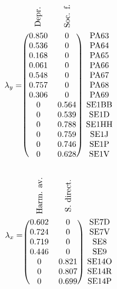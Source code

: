 \documentclass[11pt]{article}
\begin{document}
\begin{minipage}{0.32\linewidth}
\[
\lambda_y = 
\begin{blockarray}{ccc}
\rotatebox[]{90}{\textrm{\:\:Depr.}} & \rotatebox[]{90}{\textrm{\:\:Soc. f.}} \\
\begin{block}{(cc)c}
      0.850 & 0     & \textrm{PA63} \\
      0.536	& 0     & \textrm{PA64} \\
      0.168	& 0     & \textrm{PA65} \\
      0.061	& 0     & \textrm{PA66} \\
      0.548	& 0     & \textrm{PA67} \\
      0.757	& 0     & \textrm{PA68} \\
      0.306	& 0     & \textrm{PA69} \\
      0	    & 0.564 & \textrm{SE1BB} \\
      0	    & 0.539 & \textrm{SE1D} \\
      0	    & 0.788 & \textrm{SE1HH} \\
      0	    & 0.759 & \textrm{SE1J} \\
      0	    & 0.746 & \textrm{SE1P} \\
      0	    & 0.628 & \textrm{SE1V} \\ 
\end{block}
\end{blockarray}
\]
\end{minipage}
\begin{minipage}{0.45\linewidth}
\[
\lambda_x = 
\begin{blockarray}{ccc}
\rotatebox[]{90}{\textrm{\:\:Harm. av.}} & \rotatebox[]{90}{\textrm{\:\:S. direct.}} & \\
\begin{block}{(cc)c}
  0.602 & 0     & \textrm{SE7D} \\
  0.724 & 0     & \textrm{SE7V} \\
  0.719 & 0     & \textrm{SE8} \\
  0.446 & 0     & \textrm{SE9} \\
  0     & 0.821 & \textrm{SE14O} \\
  0     & 0.807 & \textrm{SE14R} \\
  0     & 0.699 & \textrm{SE14P} \\
\end{block}
\end{blockarray}
\]
\end{minipage}
\end{document}
